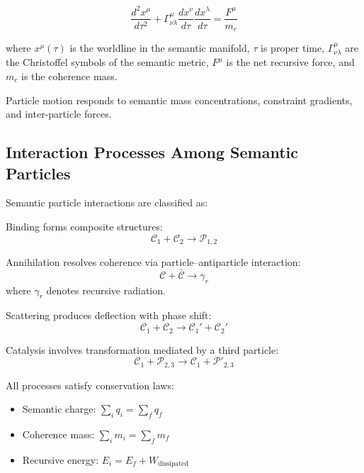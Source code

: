 \begin{equation}
\frac{d^2 x^\mu}{d\tau^2} + \Gamma^\mu_{\nu\lambda} \frac{dx^\nu}{d\tau} \frac{dx^\lambda}{d\tau} = \frac{F^\mu}{m_c}
\end{equation}

where \(x^\mu(\tau)\) is the worldline in the semantic manifold, \(\tau\) is proper time, \(\Gamma^\mu_{\nu\lambda}\) are the Christoffel symbols of the semantic metric, \(F^\mu\) is the net recursive force, and \(m_c\) is the coherence mass.

Particle motion responds to semantic mass concentrations, constraint gradients, and inter-particle forces.

\subsection{Interaction Processes Among Semantic Particles}

Semantic particle interactions are classified as:

Binding forms composite structures:
\begin{equation}
\mathcal{C}_1 + \mathcal{C}_2 \to \mathcal{P}_{1,2}
\end{equation}

Annihilation resolves coherence via particle–antiparticle interaction:
\begin{equation}
\mathcal{C} + \bar{\mathcal{C}} \to \gamma_r
\end{equation}
where \(\gamma_r\) denotes recursive radiation.

Scattering produces deflection with phase shift:
\begin{equation}
\mathcal{C}_1 + \mathcal{C}_2 \to \mathcal{C}_1' + \mathcal{C}_2'
\end{equation}

Catalysis involves transformation mediated by a third particle:
\begin{equation}
\mathcal{C}_1 + \mathcal{P}_{2,3} \to \mathcal{C}_1 + \mathcal{P}'_{2,3}
\end{equation}

All processes satisfy conservation laws:
\begin{itemize}
    \item Semantic charge: \(\sum_i q_i = \sum_f q_f\)
    \item Coherence mass: \(\sum_i m_i = \sum_f m_f\)
    \item Recursive energy: \(E_i = E_f + W_{\mathrm{dissipated}}\)
\end{itemize}

